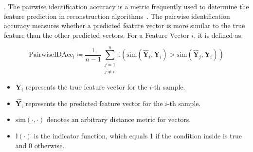 



. The pairwise identification accuracy is a metric frequently used to determine the feature prediction in reconstruction algorithms~\cite{shirakawaSpuriousReconstructionBrain2024}. 
The pairwise identification accuracy measures whether a predicted feature vector is more similar to the true feature than the other predicted vectors. For a Feature Vector $i$, it is defined as:



\[ %
\text{PairwiseIDAcc}_i \coloneq \frac{1}{n-1} \sum_{\substack{j=1 \\ j \neq i}}^{n} \mathbb{I} \left(  \text{sim}\left(\mathbf{\hat{Y}}_{i}, \mathbf{Y}_{i}\right)  > \text{sim}\left(\mathbf{\hat{Y}}_{j}, \mathbf{Y}_{i} \right) \right)
\]

\begin{itemize}
    \item \( \mathbf{Y}_{i} \) represents the true feature vector for the \( i \)-th sample.
    \item \( \mathbf{\hat{Y}}_{i} \) represents the predicted feature vector for the \( i \)-th sample.
    \item \( \text{sim}\left( \cdot, \cdot \right) \) denotes an arbitrary distance metric for vectors.
    \item \( \mathbb{I}(\cdot) \) is the indicator function, which equals 1 if the condition inside is true and 0 otherwise.
\end{itemize}

